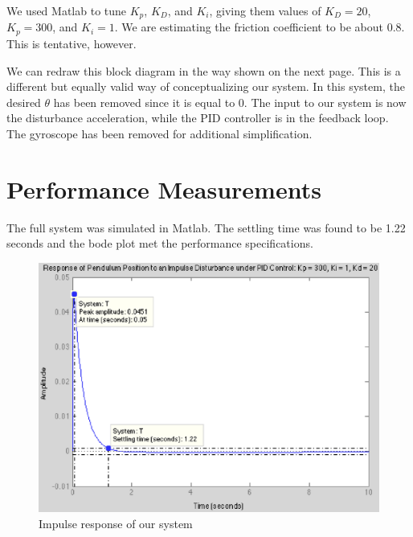 \documentclass{notes}
\begin{document}
We used Matlab to tune $K_p$, $K_D$, and $K_i$, giving them values of $K_D=20$, $K_p=300$, and $K_i=1$. We are estimating the friction coefficient to be about 0.8. This is tentative, however.

We can redraw this block diagram in the way shown on the next page. This is a different but equally valid  way of conceptualizing our system. In this system, the desired $\theta$ has been removed since it is equal to 0. The input to our system is now the disturbance acceleration, while  the PID controller is in the feedback loop. The gyroscope has been removed for additional simplification. 

\newpage
\section{Performance Measurements}
The full system was simulated in Matlab. The settling time was found to be 1.22 seconds and the bode plot met the performance specifications.

\begin{figure}[!h]
  \begin{center}
    \includegraphics[width=5 in]{pics/performance_measurements/impulse_response_perf.eps}
  \end{center}
  \caption{Impulse response of our system}
  \label{fig:impulse_response}
\end{figure}
\end{document}
